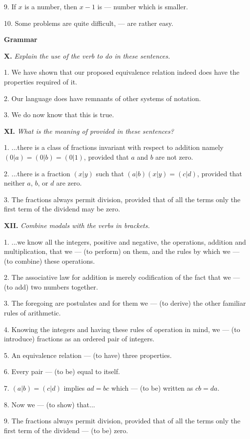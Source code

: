 \documentclass[a4paper]{article}
\newcommand{\ESect}[1]{\medskip\par{\large \textbf{#1}}\par}
\newcommand{\ETask}[2]{\medskip\par\textbf{#1.} \textit{#2}\par}
\begin{document}
9. If $x$ is a number, then $x-1$ is --- number which is smaller.

10. Some problems are quite difficult, --- are rather easy.

\ESect{Grammar}

\ETask{X}{Explain the use of the verb to do in these sentences.}

1. We have shown that our proposed equivalence relation indeed does have the properties required of it.

2. Our language does have remnants of other systems of notation.

3. We do now know that this is true.

\ETask{XI}{What is the meaning of provided in these sentences?}

1. ...there is a class of fractions invariant with respect to addition namely $(0|a)=(0|b)=(0|1)$, provided that $a$ and $b$
are not zero.

2. ...there is a fraction $(x|y)$ such that $(a|b)(x|y)=(c|d)$, provided that neither $a$, $b$, or $d$ are zero.

3. The fractions always permit division, provided that of all the terms only the first term of the dividend may be zero.

\ETask{XII}{Combine modals with the verbs in brackets.}

1. ...we know all the integers, positive and negative, the operations, addition and multiplication, that we --- (to perform)
on them, and the rules by which we --- (to combine) these operations.

2. The associative law for addition is merely codification of the fact that we --- (to add) two numbers together.

3. The foregoing are postulates and for them we --- (to derive) the other familiar rules of arithmetic.

4. Knowing the integers and having these rules of operation in mind, we --- (to introduce) fractions as an ordered pair of integers.

5. An equivalence relation --- (to have) three properties.

6. Every pair --- (to be) equal to itself.

7. $(a|b)=(c|d)$ implies $ad=bc$ which --- (to be) written as $cb = da$.

8. Now we --- (to show) that...

9. The fractions always permit division, provided that of all the terms only the first term of the dividend --- (to be) zero.
\end{document}
